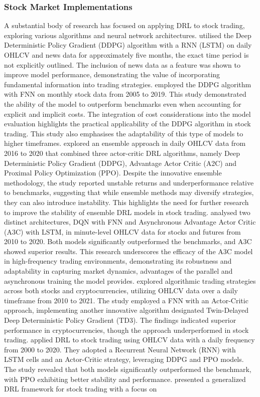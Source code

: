 \subsubsection{Stock Market Implementations}

A substantial body of research has focused on applying DRL to stock trading, exploring various algorithms and neural network architectures. \cite{saini_stock_2019} utilised the Deep Deterministic Policy Gradient (DDPG) algorithm with a RNN (LSTM) on daily OHLCV and news data for approximately five months, the exact time period is not explicitly outlined. The inclusion of news data as a feature was shown to improve model performance, demonstrating the value of incorporating fundamental information into trading strategies. \cite{gran_deep_2019} employed the DDPG algorithm with FNN on monthly stock data from 2005 to 2019. This study demonstrated the ability of the model to outperform benchmarks even when accounting for explicit and implicit costs. The integration of cost considerations into the model evaluation highlights the practical applicability of the DDPG algorithm in stock trading. This study also emphasises the adaptability of this type of models to higher timeframes. \cite{kong_empirical_2023} explored an ensemble approach in daily OHLCV data from 2016 to 2020 that combined three actor-critic DRL algorithms, namely Deep Deterministic Policy Gradient (DDPG), Advantage Actor Critic (A2C) and Proximal Policy Optimization (PPO). Despite the innovative ensemble methodology, the study reported unstable returns and underperformance relative to benchmarks, suggesting that while ensemble methods may diversify strategies, they can also introduce instability. This highlights the need for further research to improve the stability of ensemble DRL models in stock trading. \cite{li_deep_2019} analysed two distinct architectures, DQN with FNN and Asynchronous Advantage Actor Critic (A3C) with LSTM, in minute-level OHLCV data for stocks and futures from 2010 to 2020. Both models significantly outperformed the benchmarks, and A3C showed superior results. This research underscores the efficacy of the A3C model in high-frequency trading environments, demonstrating its robustness and adaptability in capturing market dynamics, advantages of the parallel and asynchronous training the model provides. \cite{majidi_algorithmic_2022} explored algorithmic trading strategies across both stocks and cryptocurrencies, utilizing OHLCV data over a daily timeframe from 2010 to 2021. The study employed a FNN with an Actor-Critic approach, implementing another innovative algorithm designated Twin-Delayed Deep Deterministic Policy Gradient (TD3). The findings indicated superior performance in cryptocurrencies, though the approach underperformed in stock trading. \cite{sagiraju_application_2021} applied DRL to stock trading using OHLCV data with a daily frequency from 2000 to 2020. They adopted a Recurrent Neural Network (RNN) with LSTM cells and an Actor-Critic strategy, leveraging DDPG and PPO models. The study revealed that both models significantly outperformed the benchmark, with PPO exhibiting better stability and performance. \cite{sim_generalized_2023} presented a generalized DRL framework for stock trading with a focus on 